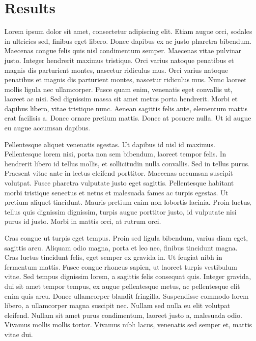 \documentclass[english,,man]{apa6}
\begin{document}
\hypertarget{results}{%
\section{Results}\label{results}}

Lorem ipsum dolor sit amet, consectetur adipiscing elit. Etiam augue orci, sodales in ultricies sed, finibus eget libero. Donec dapibus ex ac justo pharetra bibendum. Maecenas congue felis quis nisl condimentum semper. Maecenas vitae pulvinar justo. Integer hendrerit maximus tristique. Orci varius natoque penatibus et magnis dis parturient montes, nascetur ridiculus mus. Orci varius natoque penatibus et magnis dis parturient montes, nascetur ridiculus mus. Nunc laoreet mollis ligula nec ullamcorper. Fusce quam enim, venenatis eget convallis ut, laoreet ac nisi. Sed dignissim massa sit amet metus porta hendrerit. Morbi et dapibus libero, vitae tristique nunc. Aenean sagittis felis ante, elementum mattis erat facilisis a. Donec ornare pretium mattis. Donec at posuere nulla. Ut id augue eu augue accumsan dapibus.

Pellentesque aliquet venenatis egestas. Ut dapibus id nisl id maximus. Pellentesque lorem nisi, porta non sem bibendum, laoreet tempor felis. In hendrerit libero id tellus mollis, et sollicitudin nulla convallis. Sed in tellus purus. Praesent vitae ante in lectus eleifend porttitor. Maecenas accumsan suscipit volutpat. Fusce pharetra vulputate justo eget sagittis. Pellentesque habitant morbi tristique senectus et netus et malesuada fames ac turpis egestas. Ut pretium aliquet tincidunt. Mauris pretium enim non lobortis lacinia. Proin luctus, tellus quis dignissim dignissim, turpis augue porttitor justo, id vulputate nisi purus id justo. Morbi in mattis orci, at rutrum orci.

Cras congue ut turpis eget tempus. Proin sed ligula bibendum, varius diam eget, sagittis arcu. Aliquam odio magna, porta et leo nec, finibus tincidunt magna. Cras luctus tincidunt felis, eget semper ex gravida in. Ut feugiat nibh in fermentum mattis. Fusce congue rhoncus sapien, ut laoreet turpis vestibulum vitae. Sed tempus dignissim lorem, a sagittis felis consequat quis. Integer gravida, dui sit amet tempor tempus, ex augue pellentesque metus, ac pellentesque elit enim quis arcu. Donec ullamcorper blandit fringilla. Suspendisse commodo lorem libero, a ullamcorper magna suscipit nec. Nullam sed nulla eu elit volutpat eleifend. Nullam sit amet purus condimentum, laoreet justo a, malesuada odio. Vivamus mollis mollis tortor. Vivamus nibh lacus, venenatis sed semper et, mattis vitae dui.
\end{document}
